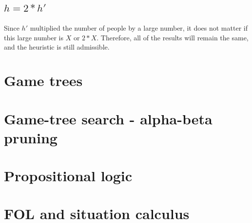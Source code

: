 \documentclass{article}                     %
\begin{document}
	\subsection{$ h=2 * h' $}
	Since $ h' $ multiplied the number of people by a large number, it does not matter if this large number is $ X $ or $ 2*X $. Therefore, all of the results will remain the same, and the heuristic is still admissible.
	
	\section{Game trees}
	
	
	\section{Game-tree search - alpha-beta pruning}
	
	
	\section{Propositional logic}
	
	
	
	\section{FOL and situation calculus}
	
	
	
\end{document}
